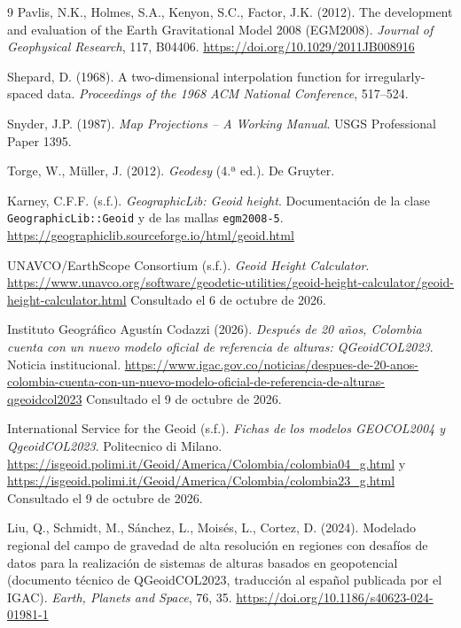 \documentclass[11pt,letterpaper]{article}
\begin{document}
\begin{thebibliography}{9}
Pavlis, N.K., Holmes, S.A., Kenyon, S.C., Factor, J.K. (2012). The development and
evaluation of the Earth Gravitational Model 2008 (EGM2008). \textit{Journal of Geophysical
Research}, 117, B04406. \url{https://doi.org/10.1029/2011JB008916}

Shepard, D. (1968). A two-dimensional interpolation function for irregularly-spaced
data. \textit{Proceedings of the 1968 ACM National Conference}, 517--524.

Snyder, J.P. (1987). \textit{Map Projections -- A Working Manual}. USGS Professional
Paper 1395.

Torge, W., Müller, J. (2012). \textit{Geodesy} (4.ª ed.). De Gruyter.

Karney, C.F.F. (s.f.). \textit{GeographicLib: Geoid height}. Documentación de la clase
\texttt{GeographicLib::Geoid} y de las mallas \texttt{egm2008-5}.
\url{https://geographiclib.sourceforge.io/html/geoid.html}

UNAVCO/EarthScope Consortium (s.f.). \textit{Geoid Height Calculator}.
\url{https://www.unavco.org/software/geodetic-utilities/geoid-height-calculator/geoid-height-calculator.html}
Consultado el 6 de octubre de 2026.

Instituto Geográfico Agustín Codazzi (2026). \textit{Después de 20 años, Colombia cuenta con un
nuevo modelo oficial de referencia de alturas: QGeoidCOL2023}. Noticia institucional.
\url{https://www.igac.gov.co/noticias/despues-de-20-anos-colombia-cuenta-con-un-nuevo-modelo-oficial-de-referencia-de-alturas-qgeoidcol2023}
Consultado el 9 de octubre de 2026.

International Service for the Geoid (s.f.). \textit{Fichas de los modelos GEOCOL2004 y QgeoidCOL2023}.
Politecnico di Milano. \url{https://isgeoid.polimi.it/Geoid/America/Colombia/colombia04_g.html} y
\url{https://isgeoid.polimi.it/Geoid/America/Colombia/colombia23_g.html}
Consultado el 9 de octubre de 2026.

Liu, Q., Schmidt, M., Sánchez, L., Moisés, L., Cortez, D. (2024). Modelado regional del campo de
gravedad de alta resolución en regiones con desafíos de datos para la realización de sistemas de
alturas basados en geopotencial (documento técnico de QGeoidCOL2023, traducción al español publicada
por el IGAC). \textit{Earth, Planets and Space}, 76, 35.
\url{https://doi.org/10.1186/s40623-024-01981-1}


\end{thebibliography}
\end{document}
